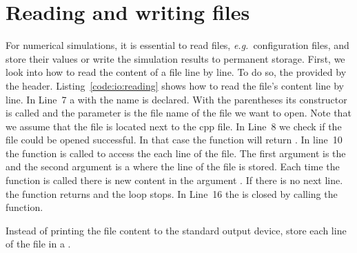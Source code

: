 \section{Reading and writing files}
For numerical simulations, it is essential to read files, \emph{e.g.}\ configuration files, and store their values or write the simulation results to permanent storage. First, we look into how to read the content of a file line by line. To do so, the  provided by the  header. Listing~\ref{code:io:reading} shows how to read the file's content  line by line. In Line~7 a  with the name  is declared. With the parentheses its constructor is called and the parameter is the file name of the file we want to open. Note that we assume that the file is located next to the cpp file. In Line~8 we check if the file could be opened successful. In that case the function  will return . In line~10 the function  is called to access the each line of the file. The first argument is the  and the second argument is a  where the line of the file is stored. Each time the function is called there is new content in the argument . If there is no next line. the function returns  and the  loop stops. In Line~16 the  is closed by calling the  function.\\



\begin{exercise}
Instead of printing the file content to the standard output device, store each line of the file in a .
\end{exercise}
\vspace{0.25cm}

